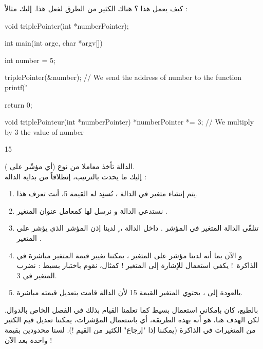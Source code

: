 كيف يعمل هذا ؟ هناك الكثير من الطرق لفعل هذا. إليك مثالاً :
\begin{Csource}
void triplePointer(int *numberPointer);

int main(int argc, char *argv[])
{
	int number = 5;

	triplePointer(&number); // We send the address of number to the function
	printf("%

	return 0;
}

void triplePointeur(int *numberPointer)
{
	*numberPointer *= 3; // We multiply by 3 the value of number
}
\end{Csource}
\begin{Console}
15
\end{Console}
الدالة
تأخذ معاملا من نوع
(أي مؤشّر على
).\\
إليك ما يحدث بالترتيب، إنطلاقاً من بداية الدالة
 :
\begin{enumerate}
	\item يتم إنشاء متغير
في الدالة
،
نُسنِد له القيمة 5، أنت تعرف هذا.
	\item نستدعي الدالة
و نرسل لها كمعامل عنوان المتغير
.
	\item تتلقّى الدالة
المتغير في المؤشر
.
داخل الدالة
،
ٍ لدينا إذن المؤشر
الذي يؤشر على المتغير
.
	\item و الآن بما أنه لدينا مؤشر على المتغير
،
يمكننا تغيير قيمة المتغير
مباشرة في الذاكرة~! يكفي استعمال
للإشارة إلى المتغير
 !
كمثال، نقوم باختبار بسيط : نضرب المتغير في 3.
	\item يالعودة إلى
،
يحتوي المتغير
القيمة 15 لأن الدالة
قامت بتعديل قيمته مباشرة.
\end{enumerate}

بالطبع، كان بإمكاني استعمال
بسيط كما تعلمنا القيام بذلك في الفصل الخاص بالدوال. لكن الهدف هنا، هو أنه بهذه الطريقة، أي باستعمال المؤشرات، يمكننا تعديل قيم الكثير من المتغيرات في الذاكرة (يمكننا إذا "إرجاع" الكثير من القيم !). لسنا محدودين بقيمة واحدة بعد الآن !


